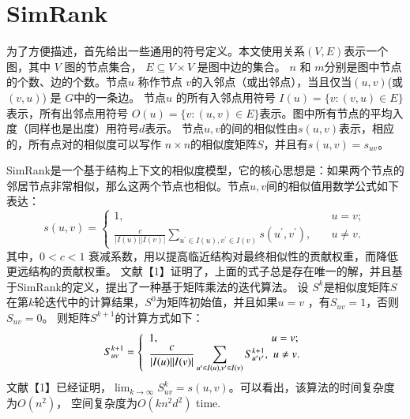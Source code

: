 \documentclass[master]{njuthesis}
\begin{document}
\section{SimRank}
为了方便描述，首先给出一些通用的符号定义。本文使用关系$(V, E)$表示一个图，其中 $V$ 图的节点集合， $E \subseteq V \times V$ 是图中边的集合。
$n$ 和 $m$分别是图中节点的个数、边的个数。节点$u$ 称作节点 $v$的入邻点（或出邻点），当且仅当$(u, v)$(或$(v,u)$) 是 $G$中的一条边。
节点$u$ 的所有入邻点用符号 $I(u)=\{v: (v, u) \in E\}$ 表示，所有出邻点用符号  $O(u)=\{v: (u, v) \in E\}$表示。图中所有节点的平均入度（同样也是出度）用符号$d$表示。
节点$u, v$的间的相似性由$s(u, v)$表示，相应的，所有点对的相似度可以写作 $n\times n$的相似度矩阵$S$，并且有$s(u, v)=s_{uv}$。

SimRank是一个基于结构上下文的相似度模型，它的核心思想是：如果两个节点的邻居节点非常相似，那么这两个节点也相似。节点$u, v$间的相似值用数学公式如下表达：
\begin{equation}
s(u, v) = \left\{
        \begin{array}{ll}
	1, & \quad u = v ; \\
	\displaystyle\frac{c}{|I(u)||I(v)|}\displaystyle\sum_{u^\prime \in I(u), v^\prime \in I(v)} s(u^\prime, v^\prime), & \quad u \ne v.
        \end{array}
    \right.
	\label{eq:one}
\end{equation}
其中，$0 < c < 1$ 衰减系数，用以提高临近结构对最终相似性的贡献权重，而降低更远结构的贡献权重。
文献【1】证明了，上面的式子总是存在唯一的解，并且基于SimRank的定义，提出了一种基于矩阵乘法的迭代算法。
设 $S^k$是相似度矩阵$S$在第$k$轮迭代中的计算结果，$S^0$为矩阵初始值，并且如果$u = v$ ，有$S_{uv} = 1$，否则$S_{uv} = 0$。
则矩阵$S^{k+1}$的计算方式如下：
\begin{equation}
S^{k+1}_{uv} = \left\{
        \begin{array}{ll}
	1, &\hspace{-0.5em}  \! u = v ; \\
	\displaystyle\frac{c}{|I(u)||I(v)|}\displaystyle\sum_{u^\prime \in I(u), v^\prime \in I(v)} S^{k+1}_{u^\prime v^\prime} , & \hspace{-0.5em} u \ne v.
        \end{array}
    \right.
	\label{eq:two}
\end{equation}
文献【1】已经证明，$\lim_{k\to\infty}S^k_{uv} = s(u,v)$。可以看出，该算法的时间复杂度为$O(n^2)$， 空间复杂度为$O(kn^2d^2)$ time.
\end{document}
